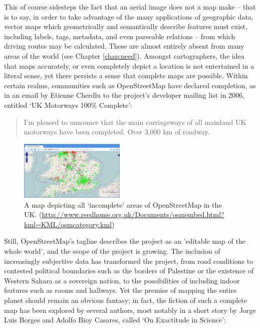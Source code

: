 \documentclass[11pt]{report}
\begin{document}
This of course sidesteps the fact that an aerial image does not a map make -- that is to say, in order to take advantage of the many applications of geographic data, vector maps which geometrically and semantically describe features must exist, including labels, tags, metadata, and even parseable relations -- from which driving routes may be calculated. These are almost entirely absent from many areas of the world (see Chapter \ref{chap:need}). Amongst cartographers, the idea that maps accurately, or even completely depict a location is not entertained in a literal sense, yet there persists a sense that complete maps are possible. Within certain realms, communities such as OpenStreetMap have declared completion, as in an email by Etienne Cherdlu to the project's developer mailing list in 2006, entitled `UK Motorways 100\% Complete': \begin{quote}I'm pleased to announce that the main carriageways of all mainland UK motorways have been completed. Over 3,000 km of roadway.\end{quote}

\begin{figure}
	\begin{flushright}
		\includegraphics[width=0.45\textwidth]{images/osm-missing-parts.png}
	\caption{A map depicting all `incomplete' areas of OpenStreetMap in the UK. (\url{http://www.reedhome.org.uk/Documents/osmembed.html?kml=KML/osmcategory.kml})}
	\end{flushright}
\end{figure}

Still, OpenStreetMap's tagline describes the project as an 'editable map of the whole world', and the scope of the project is growing. The inclusion of increasingly subjective data has transformed the project, from road conditions to contested political boundaries such as the borders of Palestine or the existence of Western Sahara as a sovereign nation, to the possibilities of including indoor features such as rooms and hallways. Yet the premise of mapping the entire planet should remain an obvious fantasy; in fact, the fiction of such a complete map has been explored by several authors, most notably in a short story by Jorge Luis Borges and Adolfo Bioy Casares, called `On Exactitude in Science':
\end{document}
